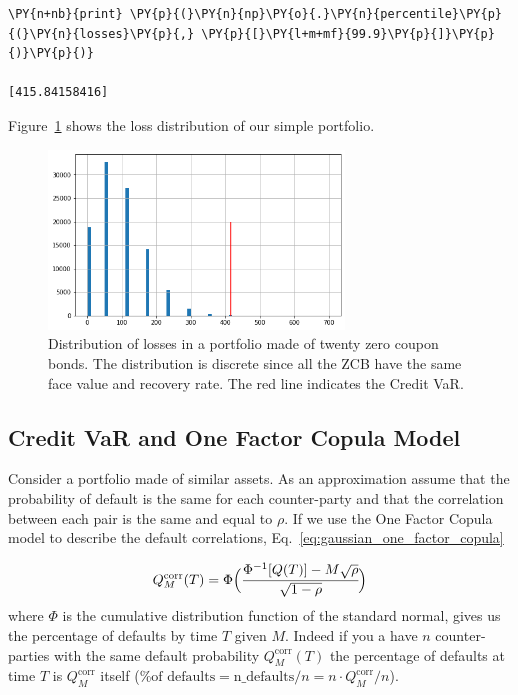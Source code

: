 \begin{tcolorbox}[breakable, size=fbox, boxrule=1pt, pad at break*=1mm,colback=cellbackground, colframe=cellborder]
\begin{Verbatim}[commandchars=\\\{\}]
\PY{n+nb}{print} \PY{p}{(}\PY{n}{np}\PY{o}{.}\PY{n}{percentile}\PY{p}{(}\PY{n}{losses}\PY{p}{,} \PY{p}{[}\PY{l+m+mf}{99.9}\PY{p}{]}\PY{p}{)}\PY{p}{)}

[415.84158416]
\end{Verbatim}
\end{tcolorbox}
Figure~\ref{fig:credit_var} shows the loss distribution of our simple portfolio.

\begin{figure}[htb]
\centering
\includegraphics[width=0.7\textwidth]{figures/credit_var_zcb.png}
\caption{Distribution of losses in a portfolio made of twenty zero coupon bonds. The distribution is discrete since all the ZCB have the same face value and recovery rate. The red line indicates the Credit VaR.}
\label{fig:credit_var}
\end{figure}

\subsection{Credit VaR and One Factor Copula Model}
Consider a portfolio made of similar assets. As an approximation assume that the probability of default is the same for each counter-party and that the correlation between each pair is the same and equal to $\rho$. If we use the One Factor Copula model to describe the default correlations, Eq.~\ref{eq:gaussian_one_factor_copula}

\begin{equation}
Q^{\textrm{corr}}_M(T) = \Phi\Big(\cfrac{\Phi^{-1}[Q(T)]-M\sqrt{\rho}}{\sqrt{1-\rho}}\Big)
\label{eq:conditional_default_prob}
\end{equation}
where $\Phi$ is the cumulative distribution function of the standard normal,
gives us the percentage of defaults by time $T$ given $M$. 
Indeed if you a have $n$ counter-parties with the same default probability $Q^{\textrm{corr}}_M(T)$ the percentage of defaults at time $T$ is $Q^{\textrm{corr}}_M$ itself ($\textrm{\% of defaults} = \textrm{n\_defaults}/n = n\cdot Q^{\textrm{corr}}_M/n$).

